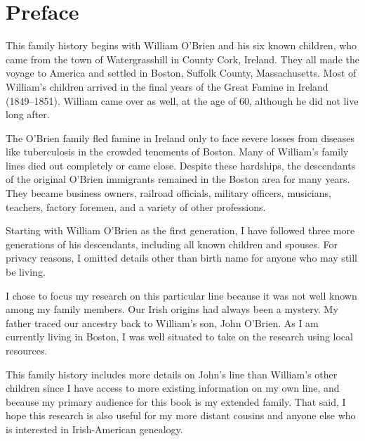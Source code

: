 \chapter{Preface}

This family history begins with William O'Brien and his six known children, who came from the town of Watergrasshill in County Cork, Ireland. They all made the voyage to America and settled in Boston, Suffolk County, Massachusetts. Most of William's children arrived in the final years of the Great Famine in Ireland (1849--1851). William came over as well, at the age of 60, although he did not live long after.

The O'Brien family fled famine in Ireland only to face severe losses from diseases like tuberculosis in the crowded tenements of Boston. Many of William's family lines died out completely or came close. Despite these hardships, the descendants of the original O'Brien immigrants remained in the Boston area for many years. They became business owners, railroad officials, military officers, musicians, teachers, factory foremen, and a variety of other professions.

Starting with William O'Brien as the first generation, I have followed three more generations of his descendants, including all known children and spouses. For privacy reasons, I omitted details other than birth name for anyone who may still be living. 

I chose to focus my research on this particular line because it was not well known among my family members. Our Irish origins had always been a mystery. My father traced our ancestry back to William's son, John O'Brien. As I am currently living in Boston, I was well situated to take on the research using local resources. 

This family history includes more details on John's line than William's other children since I have access to more existing information on my own line, and because my primary audience for this book is my extended family. That said, I hope this research is also useful for my more distant cousins and anyone else who is interested in Irish-American genealogy. 

